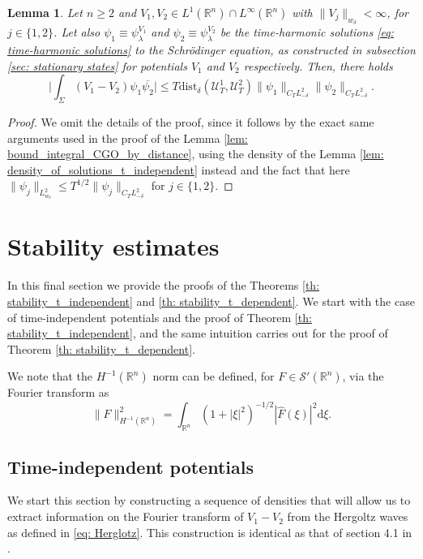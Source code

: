 \documentclass[10pt,a4paper]{amsart}
\newtheorem{lemma}[proposition]{Lemma}
\theoremstyle{remark}
\theoremstyle{definition}
\newcommand{\R}{\mathbb{R}}
\newcommand{\dd}{\mathrm{d}}
\newcommand{\dist}{\mathrm{dist}}
\def\cal{\mathcal}
\def\ovl{\overline}
\begin{document}
\begin{lemma}\label{lem: bound_int_t-harmonic_by_distance}
Let $n\geq2$ and $V_1, V_2\in L^1(\R^n)\cap L^\infty(\R^n)$ with $\|V_j\|_{w_\delta} < \infty$, for $j\in \{1, 2\}$. Let also $\psi_1\equiv \psi_\lambda^{V_1}$ and $\psi_2 \equiv \psi_\lambda^{V_2}$ be the time-harmonic solutions \eqref{eq: time-harmonic solutions} to the Schr\"odinger equation, as constructed in subsection \ref{sec: stationary states} for potentials $V_1$ and $V_2$ respectively. Then, there holds
%
\begin{equation}\label{eq: integral_bound_stationary_by_dist}
\Big| \int_\Sigma (V_1-V_2) \psi_1 \ovl{\psi_2} \Big| \leq T \dist_\delta (\cal{U}_T^1, \cal{U}_T^2) \|\psi_1\|_{C_TL^2_{-\delta}} \| \psi_2\|_{C_TL^2_{-\delta}}. 
\end{equation}
%
\end{lemma}
%
\begin{proof}
%
We omit the details of the proof, since it follows by the exact same arguments used in the proof of the Lemma \ref{lem: bound_integral_CGO_by_distance}, using the density of the Lemma \ref{lem: density_of_solutions_t_independent} instead and the fact that here $\|\psi_j\|_{L^2_{w_\delta}} \leq T^{1/2} \| \psi_j\|_{C_TL^2_{-\delta}}$ for $j\in\{1, 2\}$. 
%
\end{proof}









\section{Stability estimates}\label{sec: stability_estimates}
%
In this final section we provide the proofs of the Theorems \ref{th: stability_t_independent} and \ref{th: stability_t_dependent}. We start with the case of time-independent potentials and the proof of  Theorem \ref{th: stability_t_independent}, and the same intuition carries out for the proof of Theorem \ref{th: stability_t_dependent}.

We note that the $H^{-1}(\R^n)$ norm can be defined, for $F\in \mathcal{S}'(\R^n)$, via the Fourier transform as
\[
 \|F\|_{H^{-1}(\R^n)}^2=\int_{\R^n}(1+|\xi|^2)^{-1/2}|\widehat F(\xi)|^2\dd \xi.
\]
%
\subsection{Time-independent potentials}\label{ssec: stability_time_independent}
%
%
We start this section by constructing a sequence of densities that will allow us to extract information on the Fourier transform of $V_1-V_2$ from the Hergoltz waves as defined in \eqref{eq: Herglotz}.
%
This construction is identical as that of section 4.1 in \cite{zbMATH08122191}.
\end{document}
